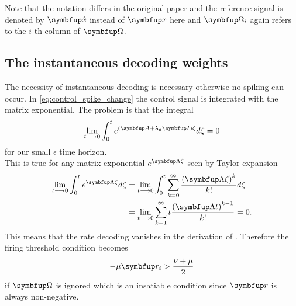 Note that the notation differs in the original paper and the reference signal is denoted by $\bmu{\hat{x}}$ instead of $\bmu{x}$ here and $\bmu{\Omega}_i$ again refers to the $i$-th column of $\bmu{\Omega}$.
\subsection{The instantaneous decoding weights}
The necessity of instantaneous decoding is necessary otherwise no spiking can occur. In \cref{eq:control_spike_change} the control signal is integrated with the matrix exponential. The problem is that the integral
\begin{equation}
	\lim_{t\longrightarrow 0 } \int_0^t e^{(\bmu{A}+\lambda_d\bmu{I})\zeta}d\zeta = 0
\end{equation}
for our small $\epsilon$ time horizon.\\
This is true for any matrix exponential $e^{\bmu{\Lambda}\zeta}$ seen by Taylor expansion
\begin{equation}
	\begin{aligned}
	\lim_{t\longrightarrow 0 }\int_0^t e^{\bmu{\Lambda}\zeta}d\zeta &= \lim_{t\longrightarrow 0 } \int_0^t \sum_{k=0}^\infty \frac{\left(\bmu{\Lambda}\zeta\right)^k}{k!} d\zeta\\
	&=\lim_{t\longrightarrow 0 }\sum_{k=1}^\infty t\frac{\left(\bmu{\Lambda}t\right)^{k-1}}{k!} = 0.
	\end{aligned}
\end{equation}
This means that the rate decoding vanishes in the derivation of . Therefore the firing threshold condition becomes
\begin{equation}
	-\mu \bmu{r}_i > \frac{\nu  + \mu}{2}
\end{equation}
if $\bmu{\Omega}$ is ignored which is an insatiable condition since $\bmu{r}$ is always non-negative.
